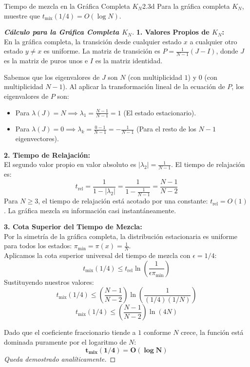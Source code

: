 \documentclass[10pt,a4paper]{article}
\begin{document}
\vspace{5mm}

\begin{ejercicio}{Tiempo de mezcla en la Gráfica Completa $K_N$}{2.3d}
    Para la gráfica completa $K_N$, muestre que $t_{\text{mix}}(1/4) = O(\log N)$.
\end{ejercicio}

\begin{proof}[\textbf{Cálculo para la Gráfica Completa $K_N$}]
    \textbf{1. Valores Propios de $K_N$:} \\
    En la gráfica completa, la transición desde cualquier estado $x$ a cualquier otro estado $y \neq x$ es uniforme. La matriz de transición es $P = \frac{1}{N-1}(J - I)$, donde $J$ es la matriz de puros unos e $I$ es la matriz identidad.
    
    Sabemos que los eigenvalores de $J$ son $N$ (con multiplicidad $1$) y $0$ (con multiplicidad $N-1$).
    Al aplicar la transformación lineal de la ecuación de $P$, los eigenvalores de $P$ son:
    \begin{itemize}
        \item Para $\lambda(J) = N \implies \lambda_1 = \frac{N - 1}{N - 1} = 1$ (El estado estacionario).
        \item Para $\lambda(J) = 0 \implies \lambda_k = \frac{0 - 1}{N - 1} = -\frac{1}{N-1}$ (Para el resto de los $N-1$ eigenvectores).
    \end{itemize}
    
    \textbf{2. Tiempo de Relajación:} \\
    El segundo valor propio en valor absoluto es $|\lambda_2| = \frac{1}{N-1}$. 
    El tiempo de relajación es:
    \[ t_{\text{rel}} = \frac{1}{1 - |\lambda_2|} = \frac{1}{1 - \frac{1}{N-1}} = \frac{N-1}{N-2} \]
    Para $N \ge 3$, el tiempo de relajación está acotado por una constante: $t_{\text{rel}} = O(1)$. La gráfica mezcla su información casi instantáneamente.
    
    \textbf{3. Cota Superior del Tiempo de Mezcla:} \\
    Por la simetría de la gráfica completa, la distribución estacionaria es uniforme para todos los estados: $\pi_{\min} = \pi(x) = \frac{1}{N}$. \\
    Aplicamos la cota superior universal del tiempo de mezcla con $\epsilon = 1/4$:
    \[ t_{\text{mix}}(1/4) \le t_{\text{rel}} \ln\left(\frac{1}{\epsilon \pi_{\min}}\right) \]
    Sustituyendo nuestros valores:
    \[ t_{\text{mix}}(1/4) \le \left(\frac{N-1}{N-2}\right) \ln\left(\frac{1}{(1/4)(1/N)}\right) \]
    \[ t_{\text{mix}}(1/4) \le \left(\frac{N-1}{N-2}\right) \ln(4N) \]
    
    Dado que el coeficiente fraccionario tiende a $1$ conforme $N$ crece, la función está dominada puramente por el logaritmo de $N$:
    \[ \mathbf{t_{\text{mix}}(1/4) = O(\log N)} \]
    \textit{Queda demostrado analíticamente.}
\end{proof}
\end{document}
